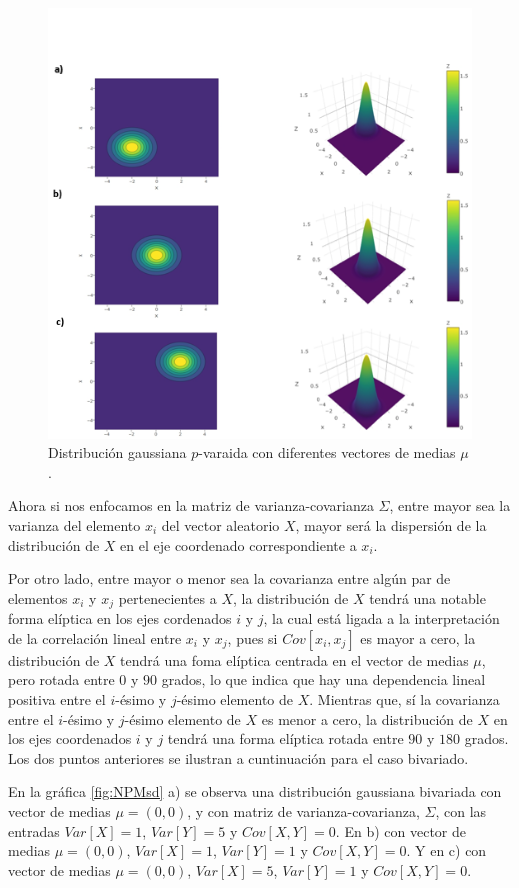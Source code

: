 \begin{figure}[ht]
	\centering
	\includegraphics[width=.8\linewidth]{Figuras/NPM}
	\caption{Distribución gaussiana $p$-varaida con diferentes vectores de medias $\mu$.}
	\label{fig:NPM}
\end{figure}

\pagebreak
Ahora si nos enfocamos en la matriz de varianza-covarianza $\Sigma$, entre mayor sea la varianza del elemento $x_{i}$ del vector aleatorio $X$, mayor será la dispersión de la distribución de $X$ en el eje coordenado correspondiente a $x_{i}$.

Por otro lado, entre mayor o menor sea la covarianza entre algún par de elementos $x_{i}$ y $x_{j}$ pertenecientes a $X$, la distribución de $X$ tendrá una notable forma elíptica en los ejes cordenados $i$ y $j$, la cual está ligada a la interpretación de la correlación lineal entre $x_{i}$ y $x_{j}$, pues si $Cov[x_{i},x_{j}]$ es mayor a cero, la distribución de $X$ tendrá una foma elíptica centrada en el vector de medias $\mu$, pero rotada entre $0$ y $90$ grados, lo que indica que hay una dependencia lineal positiva entre el $i$-ésimo y $j$-ésimo elemento de $X$. Mientras que, sí la covarianza entre el $i$-ésimo y $j$-ésimo elemento de $X$ es menor a cero, la distribución de $X$ en los ejes coordenados $i$ y $j$ tendrá una forma elíptica rotada entre $90$ y $180$ grados. Los dos puntos anteriores se ilustran a cuntinuación para el caso bivariado.

En la gráfica \ref{fig:NPMsd} a) se observa una distribución gaussiana bivariada con vector de medias $\mu=(0,0)$, y con matriz de varianza-covarianza, $\Sigma$, con las entradas $Var[X]=1$, $Var[Y]=5$ y $Cov[X,Y]=0$. En b) con vector de medias $\mu=(0,0)$, $Var[X]=1$, $Var[Y]=1$ y $Cov[X,Y]=0$. Y en c) con vector de medias $\mu=(0,0)$, $Var[X]=5$, $Var[Y]=1$ y $Cov[X,Y]=0$. 

